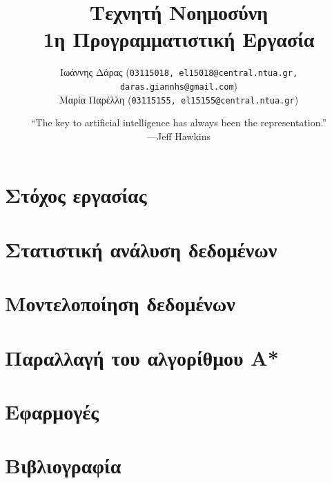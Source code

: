 \documentclass[a4paper,oneside, 11pt]{article}
\title{\textbf{Τεχνητή Νοημοσύνη \\ 1η Προγραμματιστική Εργασία}}
\author{ Ιωάννης Δάρας (\texttt{03115018, el15018@central.ntua.gr, daras.giannhs@gmail.com}) \\
	Μαρία Παρέλλη (\texttt{03115155, el15155@central.ntua.gr})
}
\date{“The key to artificial intelligence has always been the representation.” \\ —Jeff Hawkins}
\begin{document}
\maketitle
\noindent\makebox[\linewidth]{\rule{\paperwidth}{0.4pt}}

\section{Στόχος εργασίας}

\section{Στατιστική ανάλυση δεδομένων}


\section{Μοντελοποίηση δεδομένων}


\section{Παραλλαγή του αλγορίθμου A*}


\section{Εφαρμογές}


\section{Βιβλιογραφία}
\end{document}
